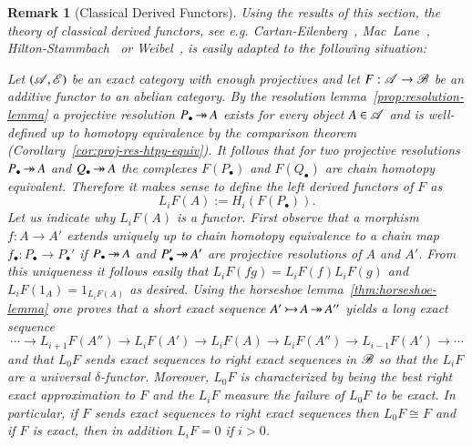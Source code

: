 \documentclass[1p]{elsarticle}
\theoremstyle{mythm}
\theoremstyle{mydef}
\newtheorem{Rem}[Thm]{Remark}
\begin{document}
\begin{Rem}[Classical Derived Functors]
  Using the results of this section, the theory of classical 
  derived functors, see 
  e.g. Cartan-Eilenberg~\cite{MR1731415}, 
  Mac~Lane~\cite{MR0156879}, Hilton-Stammbach~\cite{MR1438546} or 
  Weibel~\cite{MR1269324}, is easily adapted to the following situation:
  
  Let $(\operatorname{\mathscr{A}}, \operatorname{\mathscr{E}})$ be an exact category with enough
  projectives and let $F: \operatorname{\mathscr{A}} \to \operatorname{\mathscr{B}}$ be an additive functor
  to an abelian category. By the resolution
  lemma~\ref{prop:resolution-lemma} a projective 
  resolution $P_{\bullet} \operatorname{\twoheadrightarrow} A$ exists for every object $A \in \operatorname{\mathscr{A}}$
  and is well-defined up to homotopy equivalence by the comparison
  theorem (Corollary~\ref{cor:proj-res-htpy-equiv}). It follows that for
  two projective resolutions $P_{\bullet} \operatorname{\twoheadrightarrow} A$ and
  $Q_{\bullet} \operatorname{\twoheadrightarrow} A$ the complexes $F(P_{\bullet})$ and
  $F(Q_{\bullet})$ are chain homotopy equivalent. Therefore it makes
  sense to define the \emph{left derived functors} of $F$ as
  \[
  L_{i}F (A) := H_{i} (F(P_{\bullet})).
  \]
  Let us indicate why $L_{i}F(A)$ is a functor. First observe that
  a morphism $f: A \to A'$ extends uniquely up to chain
  homotopy equivalence to a chain map $f_{\bullet}: P_{\bullet} \to
  P_{\bullet}'$ if $P_{\bullet} \operatorname{\twoheadrightarrow} A$ and $P_{\bullet}' \operatorname{\twoheadrightarrow} A'$ are
  projective resolutions of $A$ and $A'$. From this uniqueness it
  follows easily that $L_{i}F(fg) = L_{i}F(f) L_{i}F(g)$ and
  $L_{i}F(1_{A}) = 1_{L_{i}F(A)}$ as desired. Using the horseshoe
  lemma~\ref{thm:horseshoe-lemma} one proves that a short exact
  sequence $A' \operatorname{\rightarrowtail} A \operatorname{\twoheadrightarrow} A''$ yields a long exact sequence 
  \[
  \cdots \to L_{i+1}F(A'') \to L_{i}F(A') \to L_{i}F(A) \to
  L_{i}F(A'') \to L_{i-1}F(A') \to \cdots
  \]
  and that $L_{0}F$ sends exact sequences to right exact sequences in
  $\operatorname{\mathscr{B}}$ so that the $L_{i}F$ are a universal
  $\delta$-functor. Moreover, $L_{0}F$ is characterized by being the
  best right exact approximation to $F$ and the $L_{i}F$ measure the
  failure of $L_{0}F$ to be exact. In particular, if $F$ sends
  exact sequences to right exact sequences then $L_{0}F \cong F$ and
  if $F$ is exact, then in addition $L_{i}F = 0$ if $i > 0$.
\end{Rem}
\end{document}
